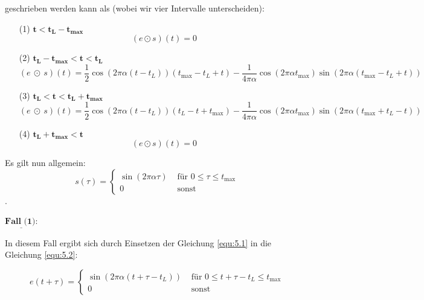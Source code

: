 \documentclass[ngerman]{scrartcl}
\begin{document}
geschrieben werden kann als (wobei wir vier Intervalle unterscheiden):

\begin{itemize}
	\item [(1)] {$\mathbf{t<t_L-t_{max}}$}
	\begin{equation*}
		(e \odot s)(t)=0
	\end{equation*}
	\item [(2)] {$\mathbf{t_L-t_{max}<t<t_L}$}
	\begin{equation*}
		(e ~\odot~ s)(t)=\frac{1}{2} \cos \left(2 \pi \alpha\left(t-t_{L}\right)\right)\left(t_{\max }-t_{L}+t\right) -\frac{1}{4 \pi \alpha} \cos \left(2 \pi \alpha t_{\max }\right) \sin \left(2 \pi \alpha\left(t_{\max }-t_{L}+t\right)\right)
	\end{equation*}
	\item [(3)] {$\mathbf{t_L<t<t_L+t_{max}}$}
	\begin{equation*}
		(e ~\odot~ s)(t)= \frac{1}{2} \cos \left(2 \pi \alpha\left(t-t_{L}\right)\right)\left(t_{L}-t+t_{\max }\right) -\frac{1}{4 \pi \alpha} \cos \left(2 \pi \alpha t_{\max }\right) \sin \left(2 \pi \alpha\left(t_{\max }+t_{L}-t\right)\right)
	\end{equation*}
	\item [(4)] {$\mathbf{t_L+t_{max}<t}$}
	\begin{equation*}
		(e \odot s)(t)=0
	\end{equation*}
\end{itemize}


Es gilt nun allgemein:
\begin{equation}
\label{equ:5.2}
	s(\tau)=\left\{\begin{array}{ll}
	\sin (2 \pi \alpha \tau) & \text { für } 0 \leq \tau \leq t_{\max } \\
	0 & \text { sonst }
	\end{array}\right.
\end{equation}
.

$\underline{\textbf{Fall (1):}}$

In diesem Fall ergibt sich durch Einsetzen der Gleichung \ref{equ:5.1} in die Gleichung \ref{equ:5.2}:

\begin{equation*}
e(t+\tau)=\left\{\begin{array}{ll}
\sin (2 \pi \alpha (t+\tau-t_L)) & \text { für } 0 \leq t+\tau-t_L \leq t_{\max } \\
0 & \text { sonst }
\end{array}\right.
\end{equation*}
	
\end{document}
